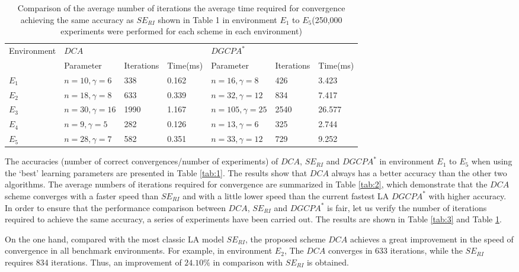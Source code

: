 \begin{table}
\caption{Comparison of the average number of iterations the average time required for convergence achieving the same accuracy as $SE_{RI}$ shown in Table 1 in environment $E_1$ to $E_5$(250,000 experiments were performed for each scheme in each environment)}
\label{tab:4}       %
\begin{tabular}{lllllll}
\hline\noalign{\smallskip}
Environment & $DCA$ &   &   & $DGCPA^{*}$ \\
\cline{2-4}\cline{5-7}
  & Parameter & Iterations & Time(ms) & Parameter & Iterations & Time(ms)\\
\cline{1-7}
$E_1$ & $n=10 ,\gamma=6 $ & 338 & 0.162 & $n=16 ,\gamma=8 $ & 426 & 3.423\\
$E_2$ & $n=18 ,\gamma=8 $ &  633 & 0.339 & $n=32 ,\gamma=12 $ &  834 & 7.417\\
$E_3$ & $n=30 ,\gamma=16 $ & 1990 & 1.167 & $n=105 ,\gamma=25 $ &  2540 & 26.577\\
$E_4$ & $n=9 ,\gamma=5 $ & 282 & 0.126 & $n=13 ,\gamma=6 $ & 325 & 2.744\\
$E_5$ & $n= 28,\gamma=7 $ & 582 & 0.351 & $n=33 ,\gamma=12 $ & 729 & 9.252\\
\cline{1-7}
\end{tabular}
\end{table}

The accuracies (number of correct convergences/number of experiments) of $DCA$, $SE_{RI}$ and $DGCPA^{*}$ in environment $E_1$ to $E_5$ when using the ‘best’ learning parameters are presented in Table \ref{tab:1}. The results show that $DCA$ always has a better accuracy than the other two algorithms. The average numbers of iterations required for convergence are summarized in Table \ref{tab:2}, which demonstrate that the $DCA$ scheme converges with a faster speed than $SE_{RI}$ and with a little lower speed than the current fastest LA $DGCPA^{*}$ with higher accuracy. In order to ensure that the performance comparison between $DCA$, $SE_{RI}$ and $DGCPA^{*}$ is fair, let us verify the number of iterations required to achieve the same accuracy, a series of experiments have been carried out. The results are shown in Table \ref{tab:3} and Table \ref{tab:4}.

On the one hand, compared with the most classic LA model $SE_{RI}$, the proposed scheme $DCA$ achieves a great improvement in the speed of convergence in all benchmark environments. For example, in environment $E_2$, The $DCA$ converges in 633 iterations, while the $SE_{RI}$ requires 834 iterations. Thus, an improvement of $24.10\%$ in comparison with $SE_{RI}$ is obtained.

